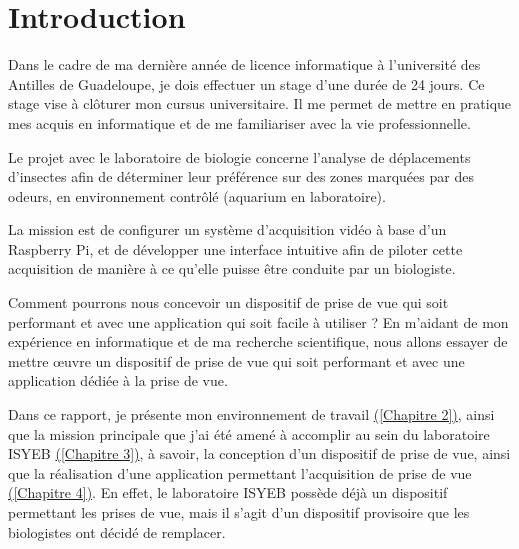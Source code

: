 \chapter{Introduction}
    Dans le cadre de ma dernière année de licence informatique à l'université des Antilles de Guadeloupe, je dois effectuer un stage d'une durée de 24 jours. Ce stage vise à clôturer mon cursus universitaire.
    Il me permet de mettre en pratique mes acquis en informatique et de me familiariser avec la vie professionnelle.

    \vspace{0.2cm}

    Le projet avec le laboratoire de biologie concerne l'analyse de déplacements d'insectes afin de déterminer leur préférence sur des zones marquées par des odeurs, en environnement contrôlé (aquarium en laboratoire).

    \vspace{0.2cm}

    La mission est de configurer un système d'acquisition vidéo à base d'un Raspberry Pi, et de développer une interface intuitive afin de piloter cette acquisition de manière à ce qu'elle puisse être conduite par un biologiste.

    \vspace{0.2cm}

    Comment pourrons nous concevoir un dispositif de prise de vue qui soit performant et avec une application qui soit facile à utiliser ? 
    En m'aidant de mon expérience en informatique et de ma recherche scientifique, nous allons essayer de mettre œuvre un dispositif de prise de vue qui soit performant et avec une application dédiée à la prise de vue.

    \vspace{0.2cm}

    Dans ce rapport, je présente mon environnement de travail \underline{(\autoref{Chapitre 2})}, ainsi que la mission principale que j'ai été amené à accomplir au sein du laboratoire ISYEB \underline{(\autoref{Chapitre 3})}, à savoir, la conception d'un dispositif de prise de vue, ainsi que la réalisation d'une application permettant l'acquisition de prise de vue \underline{(\autoref{Chapitre 4})}. En effet, le laboratoire ISYEB possède déjà un dispositif permettant les prises de vue, mais il s'agit d'un dispositif provisoire que les biologistes ont décidé de remplacer.


